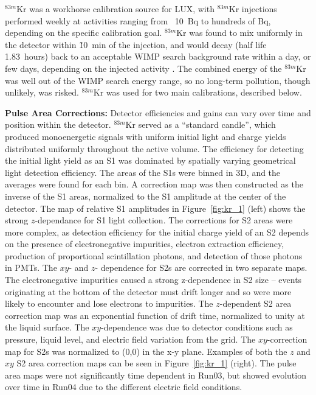 $^{83m}$Kr was a workhorse calibration source for \ac{LUX}, with $^{83m}$Kr injections performed weekly at activities ranging from ~10~Bq to hundreds of Bq, depending on the specific calibration goal. $^{83m}$Kr was found to mix uniformly in the detector within \~10~min of the injection, and would decay (half life 1.83~hours) back to an acceptable \ac{WIMP} search background rate within a day, or few days, depending on the injected activity \cite{LUXKr}. The combined energy of the $^{83m}$Kr was well out of the \ac{WIMP} search energy range, so no long-term pollution, though unlikely, was risked. $^{83m}$Kr was used for two main calibrations, described below. 

\textbf{Pulse Area Corrections:} Detector efficiencies and gains can vary over time and position within the detector. $^{83m}$Kr served as a ``standard candle'', which produced monoenergetic signals with uniform initial light and charge yields distributed uniformly throughout the active volume. The efficiency for detecting the initial light yield as an S1 was dominated by spatially varying geometrical light detection efficiency. The areas of the S1s were binned in 3D, and the averages were found for each bin. A correction map was then constructed as the inverse of the S1 areas, normalized to the S1 amplitude at the center of the detector. The map of relative S1 amplitudes in Figure~\ref{fig:kr_1} (left) shows the strong $z$-dependance for S1 light collection. The corrections for S2 areas were more complex, as detection efficiency for the initial charge yield of an S2 depends on the presence of electronegative impurities, electron extraction efficiency, production of proportional scintillation photons, and detection of those photons in \ac{PMT}s. The $xy$- and $z$- dependence for S2s are corrected in two separate maps. The electronegative impurities caused a strong z-dependence in S2 size -- events originating at the bottom of the detector must drift longer and so were more likely to encounter and lose electrons to impurities. The $z$-dependent S2 area correction map was an exponential function of drift time, normalized to unity at the liquid surface. The $xy$-dependence was due to detector conditions such as pressure, liquid level, and electric field variation from the grid. The $xy$-correction map for S2s was normalized to (0,0) in the x-y plane. Examples of both the $z$ and $xy$ S2 area correction maps can be seen in Figure~\ref{fig:kr_1} (right). The pulse area maps were not significantly time dependent in Run03, but showed evolution over time in Run04 due to the different electric field conditions. 

